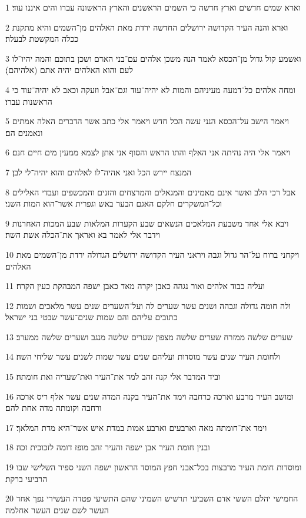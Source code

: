 \par 1 וארא שמים חדשים וארץ חדשה כי השמים הראשנים והארץ הראשונה עברו והים איננו עוד׃
\par 2 וארא והנה העיר הקדושה ירושלים החדשה ירדת מאת האלהים מן־השמים והיא מתקנת ככלה המקשטת לבעלה׃
\par 3 ואשמע קול גדול מן־הכסא לאמר הנה משכן אלהים עם־בני האדם ושכן בתוכם והמה יהיו־לו לעם והוא האלהים יהיה אתם (אלהיהם)׃
\par 4 ומחה אלהים כל־דמעה מעיניהם והמות לא יהיה־עוד וגם־אבל וזעקה וכאב לא יהיה־עוד כי הראשנות עברו׃
\par 5 ויאמר הישב על־הכסא הנני עשה הכל חדש ויאמר אלי כתב אשר הדברים האלה אמתים ונאמנים הם׃
\par 6 ויאמר אלי היה נהיתה אני האלף והתו הראש והסוף אני אתן לצמא ממעין מים חיים חנם׃
\par 7 המנצח יירש הכל ואני אהיה־לו לאלהים והוא יהיה־לי לבן׃
\par 8 אבל רכי הלב ואשר אינם מאמינים והמגאלים והמרצחים והזנים והמכשפים ועבדי האלילים וכל־המשקרים חלקם האגם הבער באש וגפרית אשר־הוא המות השני׃
\par 9 ויבא אלי אחד משבעת המלאכים הנשאים שבע הקערות המלאות שבע המכות האחרנות וידבר אלי לאמר בא ואראך את־הכלה אשת השה׃
\par 10 ויקחני ברוח על־הר גדול וגבה ויראני העיר הקדושה ירושלים הגדולה ירדת מן־השמים מאת האלהים׃
\par 11 ועליה כבוד אלהים ואור נגהה כאבן יקרה מאד כאבן ישפה המבהקת כעין הקרח׃
\par 12 ולה חומה גדולה וגבהה ושנים עשר שערים לה ועל־השערים שנים עשר מלאכים ושמות כתובים עליהם והם שמות שנים־עשר שבטי בני ישראל׃
\par 13 שערים שלשה ממזרח שערים שלשה מצפון שערים שלשה מנגב ושערים שלשה ממערב׃
\par 14 ולחומת העיר שנים עשר מוסדות ועליהם שנים עשר שמות לשנים עשר שליחי השה׃
\par 15 וביד המדבר אלי קנה זהב למד את־העיר ואת־שעריה ואת חומתה׃
\par 16 ומושב העיר מרבע וארכה כרחבה וימד את־העיר בקנה המדה שנים עשר אלף ריס ארכה ורחבה וקומתה מדה אחת להם׃
\par 17 וימד את־חומתה מאה וארבעים וארבע אמות במדת איש אשר־היא מדת המלאך׃
\par 18 ובנין חומת העיר אבן ישפה והעיר זהב מופז דומה לזכוכית זכה׃
\par 19 ומוסדות חומת העיר מרבצות בכל־אבני חפץ המוסד הראשון ישפה השני ספיר השלישי שבו הרביעי ברקת׃
\par 20 החמישי יהלם הששי אדם השביעי תרשיש השמיני שהם התשיעי פטדה העשירי נפך אחד העשר לשם שנים העשר אחלמה׃
